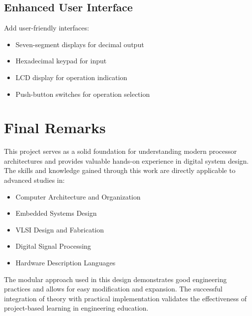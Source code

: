 \subsection{Enhanced User Interface}
Add user-friendly interfaces:
\begin{itemize}
    \item Seven-segment displays for decimal output
    \item Hexadecimal keypad for input
    \item LCD display for operation indication
    \item Push-button switches for operation selection
\end{itemize}

\section{Final Remarks}

This project serves as a solid foundation for understanding modern processor architectures and provides valuable hands-on experience in digital system design. The skills and knowledge gained through this work are directly applicable to advanced studies in:
\begin{itemize}
    \item Computer Architecture and Organization
    \item Embedded Systems Design
    \item VLSI Design and Fabrication
    \item Digital Signal Processing
    \item Hardware Description Languages
\end{itemize}

The modular approach used in this design demonstrates good engineering practices and allows for easy modification and expansion. The successful integration of theory with practical implementation validates the effectiveness of project-based learning in engineering education.
